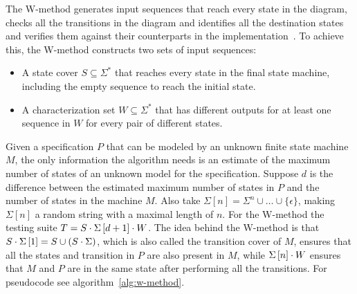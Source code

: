 The W-method generates input sequences that reach every state in the
diagram, checks all the transitions in the diagram and identifies all the
destination states and verifies them against their counterparts in
the implementation~\cite{Ipate2007}.
To achieve this, the W-method constructs two sets of input sequences:
\begin{itemize}
  \item A state cover $S \subseteq \Sigma^{*}$ that reaches every state in the
    final state machine, including the empty sequence to reach the initial state.
  \item A characterization set $W \subseteq \Sigma^{*}$ that has different
    outputs for at least one sequence in $W$ for every pair of different states.
\end{itemize}

Given a specification $P$ that can be modeled by an unknown finite state machine $M$,
the only information the algorithm needs is an estimate of the maximum number of
states of an unknown model for the specification.
Suppose $d$ is the difference between the estimated maximum number of states in $P$
and the number of states in the machine $M$.
Also take $\Sigma \left[ n \right] = \Sigma^{n} \cup \dots \cup \lbrace \epsilon \rbrace$,
making $\Sigma\left[ n \right]$ a random string with a maximal length of $n$.
For the W-method the testing suite $T = S \cdot \Sigma\left[ d + 1 \right]  \cdot W$.
The idea behind the W-method is that $S \cdot \Sigma\left[ 1 \right]  = S \cup (S
\cdot \Sigma)$, which is also called the transition cover of $M$, ensures that all the
states and transition in $P$ are also present in $M$, while
$\Sigma\left[ n \right] \cdot W$ ensures that $M$ and $P$ are in the same state after
performing all the transitions. For pseudocode see algorithm~\ref{alg:w-method}.

